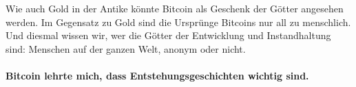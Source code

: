 Wie auch Gold in der Antike könnte Bitcoin als Geschenk der Götter angesehen
werden. Im Gegensatz zu Gold sind die Ursprünge Bitcoins nur all zu menschlich.
Und diesmal wissen wir, wer die Götter der Entwicklung und Instandhaltung sind:
Menschen auf der ganzen Welt, anonym oder nicht.

\paragraph{Bitcoin lehrte mich, dass Entstehungsgeschichten wichtig sind.}

%
%
%
%
